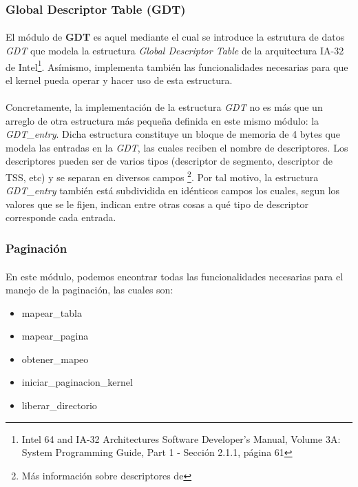 \documentclass[11pt, a4paper]{article}
\begin{document}
\subsubsection{Global Descriptor Table (GDT)}
\paragraph{}
El módulo de \textbf{GDT} es aquel mediante el cual se introduce la estrutura de datos \textit{GDT} que modela la estructura \textit{Global Descriptor Table} de la arquitectura IA-32 de Intel\footnote{Intel 64 and IA-32 Architectures Software Developer’s Manual, Volume 3A: System Programming Guide, Part 1 - Sección 2.1.1, página 61}. Asímismo, implementa también las funcionalidades necesarias para que el kernel pueda operar y hacer uso de esta estructura.

\paragraph{}
Concretamente, la implementación de la estructura \textit{GDT} no es más que un arreglo de otra estructura más pequeña definida en este mismo módulo: la \textit{GDT\_entry}. Dicha estructura constituye un bloque de memoria de 4 bytes que modela las entradas en la \textit{GDT}, las cuales reciben el nombre de descriptores. Los descriptores pueden ser de varios tipos (descriptor de segmento, descriptor de TSS, etc) y se separan en diversos campos \footnote{Más información sobre descriptores de}. Por tal motivo, la estructura \textit{GDT\_entry} también está subdividida en idénticos campos los cuales, segun los valores que se le fijen, indican entre otras cosas a qué tipo de descriptor corresponde cada entrada.



\subsubsection{Paginación}
\paragraph{}
En este módulo, podemos encontrar todas las funcionalidades necesarias para el manejo de la paginación, las cuales son:
\begin{itemize}
\item mapear\_tabla
\item mapear\_pagina
\item obtener\_mapeo
\item iniciar\_paginacion\_kernel
\item liberar\_directorio
\end{itemize}
\end{document}
